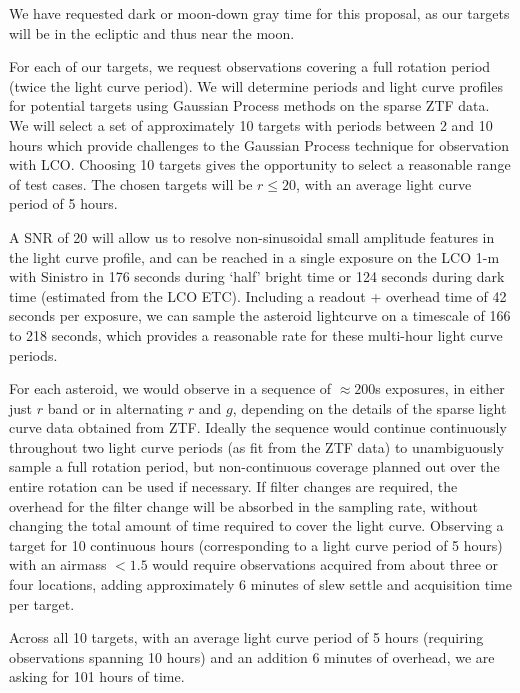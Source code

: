 \documentclass[11pt]{article}
\begin{document}
\technicaldescription
We have requested dark or moon-down gray time for this proposal, as our
targets will be in the ecliptic and thus near the moon.

For each of our targets, we request observations covering a
full rotation period (twice the light curve period). We will determine
periods and light curve profiles for potential targets using Gaussian
Process methods on the sparse ZTF data. We will select a set of
approximately 10 targets with periods between 2 and 10 hours which
provide challenges to the Gaussian Process technique for observation
with LCO. Choosing 10 targets gives the opportunity to select a reasonable range
of test cases. The chosen targets will be $r\le20$, with an average 
light curve period of 5 hours.

A SNR of 20 will allow us to resolve non-sinusoidal small amplitude
features in the light curve profile, and can be reached in a single
exposure on the LCO 1-m with Sinistro in 176 seconds during
`half' bright time or 124 seconds during dark time (estimated from the
LCO ETC). Including a readout + overhead time of 42 seconds per
exposure, we can sample the asteroid lightcurve on a timescale of 166
to 218 seconds, which provides a reasonable rate for these multi-hour
light curve periods.

For each asteroid, we would observe in a sequence of $\approx200$s
exposures, in either just $r$ band or in alternating $r$ and $g$,
depending on the details of the sparse light curve data obtained from
ZTF. Ideally the sequence would continue continuously throughout two light curve periods
(as fit from the ZTF data) to unambiguously sample a full rotation
period, but non-continuous coverage planned out over the entire rotation 
can be used if necessary. If filter changes are required, the overhead for the filter change will
be absorbed in the sampling rate, without changing the total 
amount of time required to cover the light curve. Observing a target for 
10 continuous hours (corresponding to a light curve period of 5 hours) with an airmass $<1.5$
would require observations acquired from about three or four locations, adding approximately
6 minutes of slew settle and acquisition time per target.

Across all 10 targets, with an average light curve period of 5 hours (requiring observations
spanning 10 hours) and an addition 6 minutes of overhead, we are asking for 101 hours of time.
\end{document}
